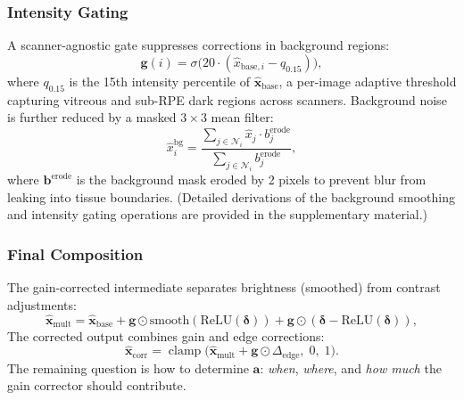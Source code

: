 \documentclass[journal,twoside,web]{ieeecolor}
\begin{document}
\subsubsection{Intensity Gating}
A scanner-agnostic gate suppresses corrections in background regions:
\begin{equation}
\mathbf{g}(i) = \sigma\!\big(20 \cdot (\hat{x}_{\text{base},i} - q_{0.15})\big),
\label{eq:intensity_gate}
\end{equation}
where $q_{0.15}$ is the 15th intensity percentile of $\hat{\mathbf{x}}_{\text{base}}$, a per-image adaptive threshold capturing vitreous and sub-RPE dark regions across scanners. Background noise is further reduced by a masked $3{\times}3$ mean filter:
\begin{equation}
\hat{x}_i^\text{bg} = \frac{\sum_{j \in \mathcal{N}_i} \hat{x}_j \cdot b_j^\text{erode}}{\sum_{j \in \mathcal{N}_i} b_j^\text{erode}},
\label{eq:bg_smooth}
\end{equation}
where $\mathbf{b}^\text{erode}$ is the background mask eroded by 2 pixels to prevent blur from leaking into tissue boundaries. (Detailed derivations of the background smoothing and intensity gating operations are provided in the supplementary material.)

\subsubsection{Final Composition}
The gain-corrected intermediate separates brightness (smoothed) from contrast adjustments:
\begin{equation}
\hat{\mathbf{x}}_\text{mult} = \hat{\mathbf{x}}_\text{base} + \mathbf{g} \odot \text{smooth}(\text{ReLU}(\boldsymbol{\delta})) + \mathbf{g} \odot (\boldsymbol{\delta} - \text{ReLU}(\boldsymbol{\delta})),
\label{eq:xmult}
\end{equation}
The corrected output combines gain and edge corrections:
\begin{equation}
\hat{\mathbf{x}}_\text{corr} = \operatorname{clamp}\!\big(\hat{\mathbf{x}}_\text{mult} + \mathbf{g} \odot \Delta_\text{edge},\; 0,\; 1\big).
\label{eq:final}
\end{equation}
The remaining question is how to determine $\mathbf{a}$: \emph{when}, \emph{where}, and \emph{how much} the gain corrector should contribute.

\end{document}
